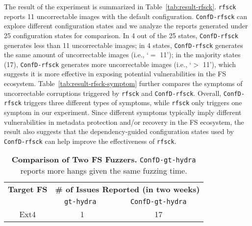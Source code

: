 The result of the experiment is summarized in Table~\ref{tab:result-rfsck}. \texttt{rfsck} reports 11 uncorrectable images with the default configuration.  \texttt{ConfD-rfsck} can explore different configuration states and we analyze the reports generated under 25 configuration states for comparison. In 4   out of the 25 states, \texttt{ConfD-rfsck} generates less than 11 uncorrectable images; in   4 states,  \texttt{ConfD-rfsck} generates the same amount of  uncorrectable images (i.e., `$=$ 11'); 
 in the majority states (17), \texttt{ConfD-rfsck}  generates more uncorrectable images (i.e., `$>$ 11'), which suggests  it is more effective in exposing potential vulnerabilities in the FS ecosystem. 
Table~\ref{tab:result-rfsck-symptom} further compares the symptoms of uncorrectable corruptions triggered by \texttt{rfsck}  and \texttt{ConfD-rfsck}. Overall, \texttt{ConfD-rfsck} triggers three different types of symptoms,  while \texttt{rfsck} only triggers one symptom in our experiment.  
 Since different symptoms typically imply different vulnerabilities in metadata protection and/or recovery in the FS ecosystem, the result also suggests that   the dependency-guided configuration states used by  \texttt{ConfD-rfsck} can help improve the effectiveness of \texttt{rfsck}.



\begin{table}[t]
	\small
	\begin{center}
		\begin{tabular}{ c | c | c    }
 	\textbf{Target FS }  &  \multicolumn{2}{c}{\textbf{\# of Issues Reported (in two weeks)}}    \\
          \cline{2-3}
           	\textbf{   }  & {\texttt{\space \space \space gt-hydra \space \space \space}}  & {\texttt{ConfD-gt-hydra}}    \\
\hline
Ext4  & 1  &  17      \\
			\hline
		\end{tabular}
	\end{center}
	\caption{ {\bf Comparison of Two FS Fuzzers.} 
\texttt{ConfD-gt-hydra} reports more hangs given the same fuzzing time.
}
	\label{tab:result-gt-hydra}
\end{table}

